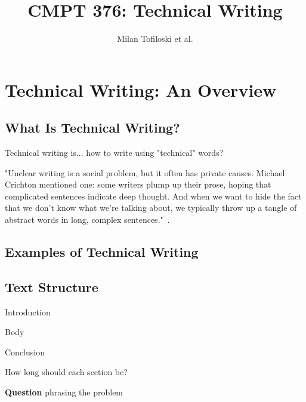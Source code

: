 \documentclass[10pt,a4paper]{book}
\author{Milan Tofiloski et al.}
\title{CMPT 376: Technical Writing}
\date{}
\begin{document}

\maketitle



\clearpage

\setcounter{tocdepth}{3}
\setcounter{secnumdepth}{3} %
\tableofcontents

\clearpage


\chapter{Technical Writing: An Overview}

\section{What Is Technical Writing?}

Technical writing is... how to write using "technical" words?

"Unclear writing is a social problem, but it often has private causes. Michael Crichton mentioned one: some writers plump up their prose, hoping that complicated sentences indicate deep thought. And when we want to hide the fact that we don't know what we're talking about, we typically throw up a tangle of abstract words in long, complex sentences."~\cite{Style11th}.


\section{Examples of Technical Writing}


\section{Text Structure}

Introduction

\noindent Body

\noindent Conclusion

How long should each section be?

\textbf{Question} phrasing the problem
\end{document}
